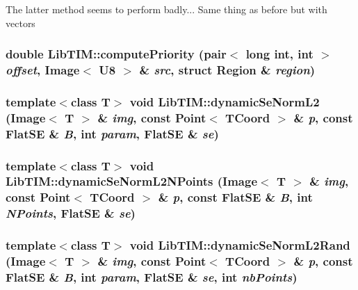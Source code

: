 The latter method seems to perform badly... Same thing as before but with vectors 
\subsubsection{\setlength{\rightskip}{0pt plus 5cm}double Lib\-TIM::compute\-Priority (pair$<$ long int, int $>$ {\em offset}, Image$<$ {\bf U8} $>$ \& {\em src}, struct Region \& {\em region})\hspace{0.3cm}{\tt  [inline]}}\label{namespaceLibTIM_a76}


\subsubsection{\setlength{\rightskip}{0pt plus 5cm}template$<$class T$>$ void Lib\-TIM::dynamic\-Se\-Norm\-L2 (Image$<$ T $>$ \& {\em img}, const Point$<$ {\bf TCoord} $>$ \& {\em p}, const Flat\-SE \& {\em B}, int {\em param}, Flat\-SE \& {\em se})}\label{namespaceLibTIM_a15}


\subsubsection{\setlength{\rightskip}{0pt plus 5cm}template$<$class T$>$ void Lib\-TIM::dynamic\-Se\-Norm\-L2NPoints (Image$<$ T $>$ \& {\em img}, const Point$<$ {\bf TCoord} $>$ \& {\em p}, const Flat\-SE \& {\em B}, int {\em NPoints}, Flat\-SE \& {\em se})}\label{namespaceLibTIM_a17}


\subsubsection{\setlength{\rightskip}{0pt plus 5cm}template$<$class T$>$ void Lib\-TIM::dynamic\-Se\-Norm\-L2Rand (Image$<$ T $>$ \& {\em img}, const Point$<$ {\bf TCoord} $>$ \& {\em p}, const Flat\-SE \& {\em B}, int {\em param}, Flat\-SE \& {\em se}, int {\em nb\-Points})}\label{namespaceLibTIM_a16}


